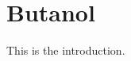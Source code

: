 \documentclass{standalone}
\begin{document}
\chapter{Butanol}

This is the introduction. \cite{Weber2011,Sarathy2013}
\end{document}
